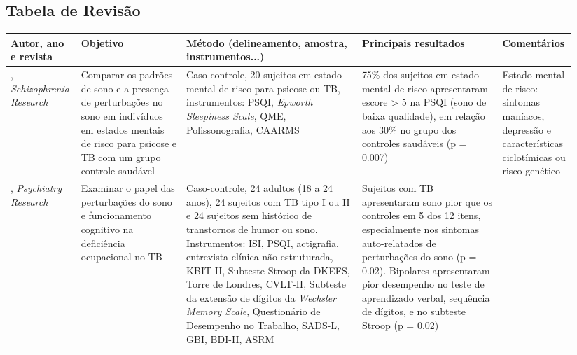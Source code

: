 \documentclass[chapter=TITLE,oneside,12pt,a4paper,english,brazil]{abntex2} %
\begin{document}
\endgroup

\postextual

\printbibliography

\anexos

\begin{anexosenv}

    \begin{landscape}
    \chapter{Tabela de Revisão}
            \noindent
            \begin{longtabu} to 
\toprule
\textbf{Autor, ano e revista} & \textbf{Objetivo} & \textbf{Método (delineamento, amostra, instrumentos...)} & \textbf{Principais resultados} & \textbf{Comentários} \\ \midrule
\endfirsthead
%
\midrule
\endhead
%
    \textcite{zanini_abnormalities_2015}, \textit{Schizophrenia Research} &
    Comparar os padrões de sono e a presença de perturbações no sono em indivíduos em estados mentais de risco para psicose e TB com um grupo controle saudável &
    Caso-controle, 20 sujeitos em estado mental de risco para psicose ou TB, instrumentos: PSQI, \textit{Epworth Sleepiness Scale}, QME, Polissonografia, CAARMS &
    75\% dos sujeitos em estado mental de risco apresentaram escore > 5 na PSQI (sono de baixa qualidade), em relação aos 30\% no grupo dos controles saudáveis (p = 0.007) &
Estado mental de risco: sintomas maníacos, depressão e características ciclotímicas ou risco genético \\ \midrule
    \textcite{boland_associations_2015}, \textit{Psychiatry Research} &
    Examinar o papel das perturbações do sono e funcionamento cognitivo na deficiência ocupacional no TB &
    Caso-controle, 24 adultos (18 a 24 anos), 24 sujeitos com TB tipo I ou II e 24 sujeitos sem histórico de transtornos de humor ou sono. Instrumentos: ISI, PSQI, actigrafia, entrevista clínica não estruturada, KBIT-II, Subteste Stroop da DKEFS, Torre de Londres, CVLT-II, Subteste da extensão de dígitos da \textit{Wechsler Memory Scale}, Questionário de Desempenho no Trabalho, SADS-L, GBI, BDI-II, ASRM &
    Sujeitos com TB apresentaram sono pior que os controles em 5 dos 12 itens, especialmente nos sintomas auto-relatados de perturbações do sono (p = 0.02). Bipolares apresentaram pior desempenho no teste de aprendizado verbal, sequência de dígitos, e no subteste Stroop (p = 0.02) &

\end{longtabu}
\end{landscape}
\end{anexosenv}
\end{document}
